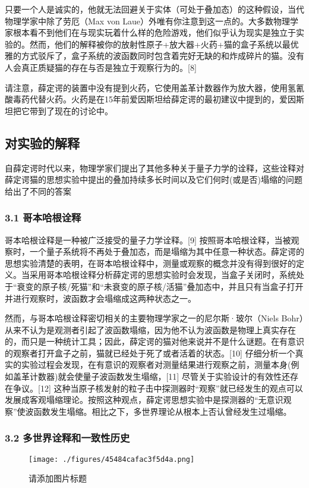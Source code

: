 只要一个人是诚实的，他就无法回避关于实体（可处于叠加态）的这种假设，当代物理学家中除了劳厄（Max von Laue）外唯有你注意到这一点的。大多数物理学家根本看不到他们在与现实玩着什么样的危险游戏，他们似乎认为现实是独立于实验的。然而，他们的解释被你的放射性原子+放大器+火药+猫的盒子系统以最优雅的方式驳斥了，盒子系统的波函数同时包含着完好无缺的和炸成碎片的猫。没有人会真正质疑猫的存在与否是独立于观察行为的。[8]

请注意，薛定谔的装置中没有提到火药，它使用盖革计数器作为放大器，使用氢氰酸毒药代替火药。火药是在15年前爱因斯坦给薛定谔的最初建议中提到的，爱因斯坦把它带到了现在的讨论中。

\subsection{对实验的解释}
自薛定谔时代以来，物理学家们提出了其他多种关于量子力学的诠释，这些诠释对薛定谔猫的思想实验中提出的叠加持续多长时间以及它们何时(或是否)塌缩的问题给出了不同的答案

\subsubsection{3.1 哥本哈根诠释}
哥本哈根诠释是一种被广泛接受的量子力学诠释。[9] 按照哥本哈根诠释，当被观察时，一个量子系统将不再处于叠加态，而是塌缩为其中任意一种状态。薛定谔的思想实验清楚的表明，在哥本哈根诠释中，测量或观察的概念并没有得到很好的定义。当采用哥本哈根诠释分析薛定谔的思想实验时会发现，当盒子关闭时，系统处于“衰变的原子核/死猫”和“未衰变的原子核/活猫”叠加态中，并且只有当盒子打开并进行观察时，波函数才会塌缩成这两种状态之一。

然而，与哥本哈根诠释密切相关的主要物理学家之一的尼尔斯·玻尔（Niels Bohr）从来不认为是观测者引起了波函数塌缩，因为他不认为波函数是物理上真实存在的，而只是一种统计工具；因此，薛定谔的猫对他来说并不是什么谜题。在有意识的观察者打开盒子之前，猫就已经处于死了或者活着的状态。[10] 仔细分析一个真实的实验过程会发现，在有意识的观察者对测量结果进行观察之前，测量本身(例如盖革计数器)就会使量子波函数发生塌缩，[11] 尽管关于实验设计的有效性还存在争议。[12] 这种当原子核发射的粒子击中探测器时“观察”就已经发生的观点可以发展成客观塌缩理论。按照这种观点，薛定谔思想实验中是探测器的“无意识观察”使波函数发生塌缩。相比之下，多世界理论从根本上否认曾经发生过塌缩。

\subsubsection{3.2 多世界诠释和一致性历史}
\begin{figure}[ht]
\centering
\texttt{[image: ./figures/45484cafac3f5d4a.png]}
\caption{请添加图片标题} \label{fig_XDEDM_4}
\end{figure}

